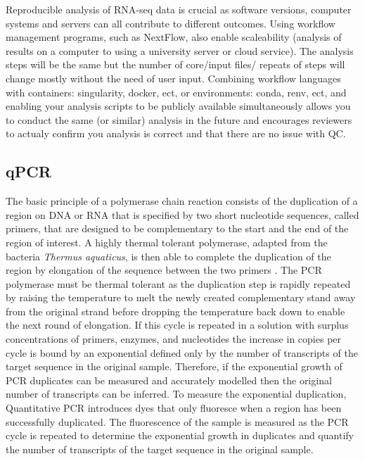 \documentclass{SBCbookchapter}
\begin{document}
Reproducible analysis of RNA-seq data is crucial as software versions, computer systems and servers can all contribute to different outcomes. Using workflow management programs, such as NextFlow, also enable scaleability (analysis of results on a computer to using a university server or cloud service). The analysis steps will be the same but the number of core/input files/ repeats of steps will change mostly without the need of user input. Combining workflow languages with containers: singularity, docker, ect, or environments: conda, renv, ect, and enabling your analysis scripts to be publicly available simultaneously allows you to conduct the same (or similar) analysis in the future and encourages reviewers to actualy confirm you analysis is correct and that there are no issue with QC.

\subsection{qPCR}

The basic principle of a polymerase chain reaction consists of the duplication of a region on DNA or RNA that is specified by two short nucleotide sequences, called primers, that are designed to be complementary to the start and the end of the region of interest. A highly thermal tolerant polymerase, adapted from the bacteria \textit{Thermus aquaticus}, is then able to complete the duplication of the region by elongation of the sequence between the two primers \cite{Holland1991}. The PCR polymerase must be thermal tolerant as the duplication step is rapidly repeated by raising the temperature to melt the newly created complementary stand away from the original strand before dropping the temperature back down to enable the next round of elongation. If this cycle is repeated in a solution with surplus concentrations of primers, enzymes, and nucleotides the increase in copies per cycle is bound by an exponential defined only by the number of transcripts of the target sequence in the original sample. Therefore, if the exponential growth of PCR duplicates can be measured and accurately modelled then the original number of transcripts can be inferred. To measure the exponential duplication, Quantitative PCR introduces dyes that only fluoresce when a region has been successfully duplicated. The fluorescence of the sample is measured as the PCR cycle is repeated to determine the exponential growth in duplicates and quantify the number of transcripts of the target sequence in the original sample.
\end{document}
